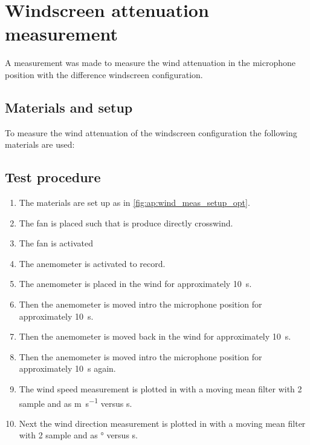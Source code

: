 \chapter{Windscreen attenuation measurement}
A measurement was made to measure the wind attenuation in the microphone position with the difference windscreen configuration.


\section*{Materials and setup}
To measure the wind attenuation of the windscreen configuration the following materials are used:

\startequipment
{}
\stopequipment




\section*{Test procedure}


\begin{enumerate}
\item The materials are set up as in \autoref{fig:ap:wind_meas_setup_opt}.
\item The fan is placed such that is produce directly crosswind.
\item The fan is activated 
\item The anemometer is activated to record.
\item The anemometer is placed in the wind for approximately \SI{10}{\second}.
\item Then the anemometer is moved intro the microphone position for approximately \SI{10}{\second}.
\item Then the anemometer is moved back in the wind for approximately \SI{10}{\second}.
\item Then the anemometer is moved intro the microphone position for approximately \SI{10}{\second} again. 
\item The wind speed measurement is plotted in \matlab with a moving mean filter with 2 sample and as \si{\meter\per\second} versus \si{\second}.
\item Next the wind direction measurement is plotted in \matlab with a moving mean filter with 2 sample and as \si{\degree} versus \si{\second}.
\end{enumerate}


